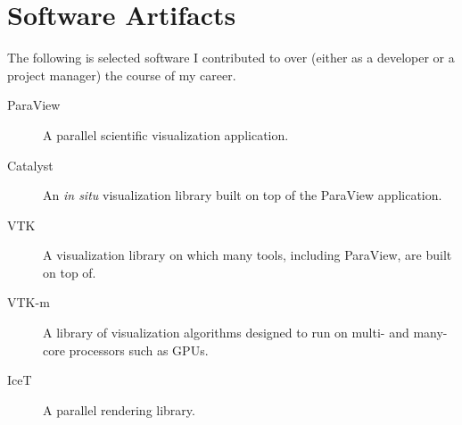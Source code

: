 \documentclass{article}
\begin{document}
\section*{Software Artifacts}

The following is selected software I contributed to over (either as a developer or a project manager) the course of my career.

\begin{description}
\item[ParaView] A parallel scientific visualization application.
\item[Catalyst] An \emph{in situ} visualization library built on top of the ParaView application.
\item[VTK] A visualization library on which many tools, including ParaView, are built on top of.
\item[VTK-m] A library of visualization algorithms designed to run on multi- and many-core processors such as GPUs.
\item[IceT] A parallel rendering library.
\end{description}
\end{document}
